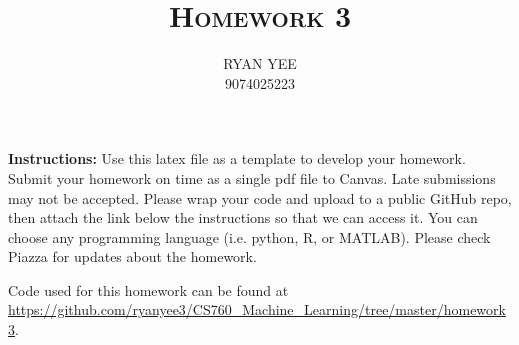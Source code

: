 \documentclass[a4paper]{article}
\title{\textsc{Homework 3}} %
\author{
RYAN YEE \\
9074025223\\
}
\date{}
\theoremstyle{definition}
\newenvironment{soln}{
    \leavevmode\color{blue}\ignorespaces
}{}
\begin{document}
\maketitle 


\textbf{Instructions:} 
Use this latex file as a template to develop your homework. Submit your homework on time as a single pdf file to Canvas. Late submissions may not be accepted. Please wrap your code and upload to a public GitHub repo, then attach the link below the instructions so that we can access it. You can choose any programming language (i.e. python, R, or MATLAB). Please check Piazza for updates about the homework.

\begin{soln}
	Code used for this homework can be found at \url{https://github.com/ryanyee3/CS760_Machine_Learning/tree/master/homework3}.
\end{soln}
\end{document}
